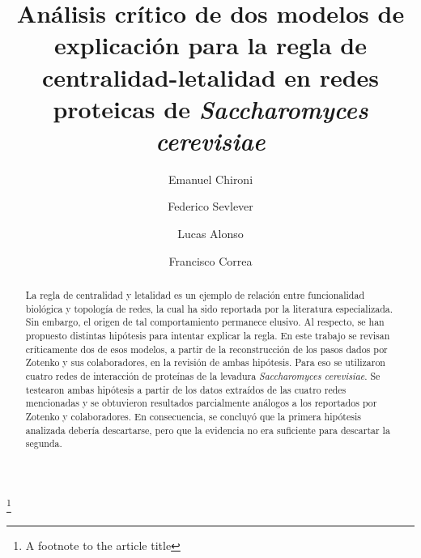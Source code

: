 \documentclass[%
 reprint,
 amsmath,amssymb,
 aps,
]{revtex4-1}
\def \sc {\em Saccharomyces cerevisiae}
\begin{document}

\title{An\'alisis cr\'itico de dos modelos de explicaci\'on para la regla de centralidad-letalidad en redes proteicas de  \sc}%
\thanks{A footnote to the article title}%

\author{Emanuel Chironi}
\author{Federico Sevlever}%
\author{Lucas Alonso}
\author{Francisco Correa}
%




\begin{abstract}
La regla de centralidad y letalidad es un ejemplo de relaci\'on entre funcionalidad biol\'ogica y topolog\'ia de redes, la cual ha sido reportada por la literatura especializada. Sin embargo, el origen de tal comportamiento permanece elusivo. Al respecto, se han propuesto distintas hip\'otesis para intentar explicar la regla. En este trabajo se revisan cr\'iticamente dos de esos modelos, a partir de la reconstrucci\'on de los pasos dados por Zotenko y sus colaboradores, en la revisi\'on de ambas hip\'otesis. Para eso se utilizaron cuatro redes de interacci\'on de prote\'inas de la levadura {\sc}. Se testearon ambas hip\'otesis a partir de los datos extra\'idos de las cuatro redes mencionadas y se obtuvieron resultados parcialmente an\'alogos a los reportados por Zotenko y colaboradores. En consecuencia, se concluy\'o que la primera  hip\'otesis analizada deber\'ia descartarse, pero que la evidencia no era suficiente para descartar la segunda.
\end{abstract}

\maketitle
\end{document}
